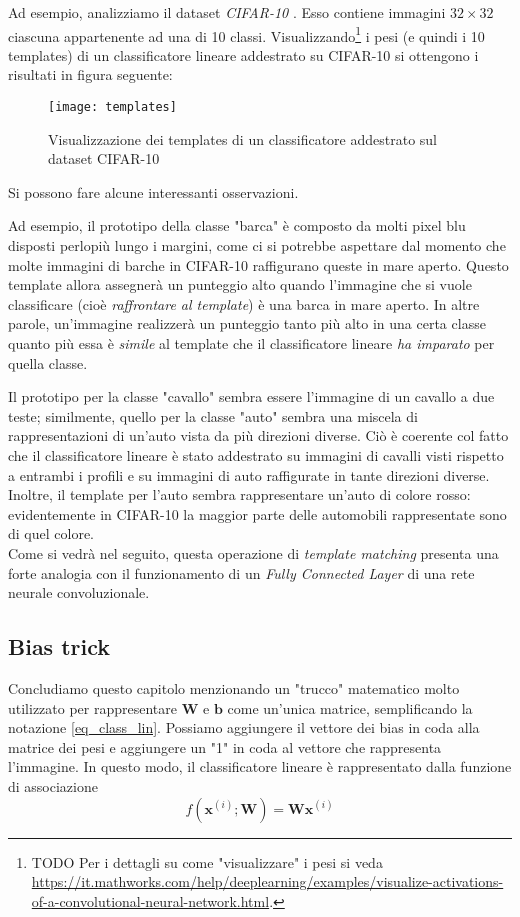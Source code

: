 Ad esempio, analizziamo il dataset \textit{CIFAR-10} \cite{cifar10}. Esso contiene immagini $32\times 32$ ciascuna appartenente ad una di 10 classi. Visualizzando\footnote{TODO Per i dettagli su come "visualizzare" i pesi si veda \url{https://it.mathworks.com/help/deeplearning/examples/visualize-activations-of-a-convolutional-neural-network.html}.} i pesi (e quindi i 10 templates) di un classificatore lineare addestrato su CIFAR-10 si ottengono i risultati in figura seguente:

\begin{figure}[h]
\centering
\texttt{[image: templates]}
\caption{Visualizzazione dei templates di un classificatore addestrato sul dataset CIFAR-10}
\label{templates}
\end{figure}

Si possono fare alcune interessanti osservazioni.

Ad esempio, il prototipo della classe "barca" è composto da molti pixel blu disposti perlopiù lungo i margini, come ci si potrebbe aspettare dal momento che molte immagini di barche in CIFAR-10 raffigurano queste in mare aperto. Questo template allora assegnerà un punteggio alto quando l'immagine che si vuole classificare (cioè \textit{raffrontare al template}) è una barca in mare aperto. In altre parole, un'immagine realizzerà un punteggio tanto più alto in una certa classe quanto più essa è \textit{simile} al template che il classificatore lineare \textit{ha imparato} per quella classe.

Il prototipo per la classe "cavallo" sembra essere l'immagine di un cavallo a due teste; similmente, quello per la classe "auto" sembra una miscela di rappresentazioni di un'auto vista da più direzioni diverse. Ciò è coerente col fatto che il classificatore lineare è stato addestrato su immagini di cavalli visti rispetto a entrambi i profili e su immagini
di auto raffigurate in tante direzioni diverse. Inoltre, il template per l'auto sembra rappresentare un'auto di colore rosso: evidentemente in CIFAR-10 la maggior parte delle automobili rappresentate sono di quel colore.\\

Come si vedrà nel seguito, questa operazione di \textit{template matching} presenta una forte analogia con il funzionamento di un \textit{Fully Connected Layer} di una rete neurale convoluzionale.

\subsection*{Bias trick}
Concludiamo questo capitolo menzionando un "trucco" matematico molto utilizzato per rappresentare $\mathbf{W}$ e $\mathbf{b}$ come un'unica matrice, semplificando la notazione \ref{eq_class_lin}.
Possiamo aggiungere il vettore dei bias in coda alla matrice dei pesi e aggiungere un "1" in coda al vettore che rappresenta l'immagine. In questo modo, il classificatore lineare è rappresentato dalla funzione di associazione
\begin{equation} \label{eq_bias_trick}
f(\mathbf{x}^{(i)};\mathbf{W})=\mathbf{W}\mathbf{x}^{(i)}
\end{equation}

